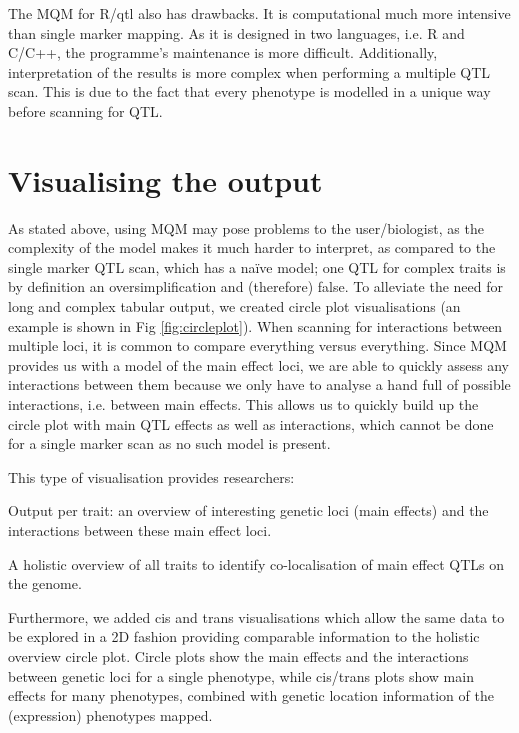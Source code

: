 The MQM for R/qtl also has drawbacks. It is computational much more intensive than single marker mapping. As it is designed in two languages, i.e. 
R and C/C++, the programme’s maintenance is more difficult. Additionally, interpretation of the results is more complex when performing a multiple 
QTL scan. This is due to the fact that every phenotype is modelled in a unique way before scanning for QTL. 

\section{Visualising the output}
As stated above, using MQM may pose problems to the user/biologist, as the complexity of the model makes it much harder to interpret, as compared to 
the single marker QTL scan, which has a naïve model; one QTL for complex traits is by definition an oversimplification and (therefore) false. To 
alleviate the need for long and complex tabular output, we created circle plot visualisations (an example is shown in Fig \ref{fig:circleplot}). When 
scanning for interactions between multiple loci, it is common to compare everything versus everything. Since MQM provides us with a model of the main 
effect loci, we are able to quickly assess any interactions between them because we only have to analyse a hand full of possible interactions, i.e. 
between main effects. This allows us to quickly build up the circle plot with main QTL effects as well as interactions, which cannot be done for a 
single marker scan as no such model is present. 

This type of visualisation provides researchers:

Output per trait: an overview of interesting genetic loci (main effects) and the interactions between these main effect loci.

A holistic overview of all traits to identify co-localisation of main effect QTLs on the genome.

Furthermore, we added cis and trans visualisations which allow the same data to be explored in a 2D fashion providing comparable information to the 
holistic overview circle plot. Circle plots show the main effects and the interactions between genetic loci for a single phenotype, while cis/trans 
plots show main effects for many phenotypes, combined with genetic location information of the (expression) phenotypes mapped. 

